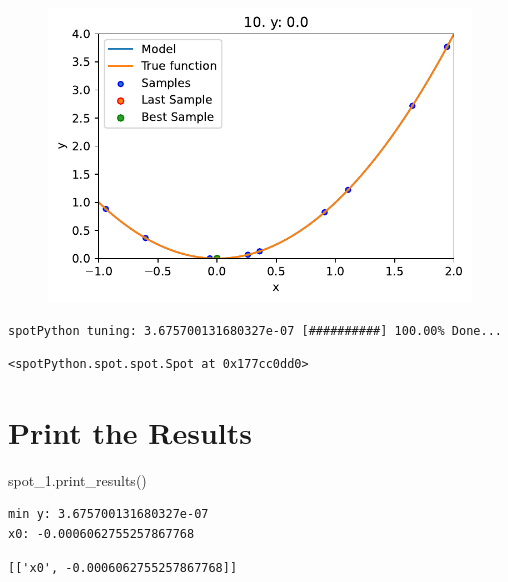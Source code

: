 \documentclass[
  letterpaper,
  DIV=11,
  numbers=noendperiod]{scrreprt}
\newenvironment{Shaded}{\begin{snugshade}}{\end{snugshade}}
\newcommand{\NormalTok}[1]{\textcolor[rgb]{0.00,0.23,0.31}{#1}}
\begin{document}
\begin{figure}[H]

{\centering \includegraphics{007_num_spot_intro_files/figure-pdf/cell-10-output-2.pdf}

}

\end{figure}

\begin{verbatim}
spotPython tuning: 3.675700131680327e-07 [##########] 100.00% Done...
\end{verbatim}

\begin{verbatim}
<spotPython.spot.spot.Spot at 0x177cc0dd0>
\end{verbatim}

\hypertarget{print-the-results-1}{%
\section{Print the Results}\label{print-the-results-1}}

\begin{Shaded}
\begin{Highlighting}[]
\NormalTok{spot\_1.print\_results()}
\end{Highlighting}
\end{Shaded}

\begin{verbatim}
min y: 3.675700131680327e-07
x0: -0.0006062755257867768
\end{verbatim}

\begin{verbatim}
[['x0', -0.0006062755257867768]]
\end{verbatim}
\end{document}
